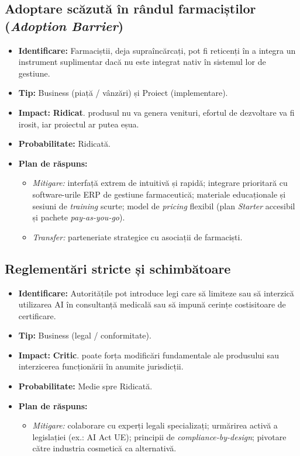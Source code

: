 \subsection{Adoptare scăzută în rândul farmaciștilor (\textit{Adoption Barrier})}
\begin{itemize}
    \item \textbf{Identificare:} Farmaciștii, deja supraîncărcați, pot fi reticenți în a integra un instrument suplimentar dacă nu este integrat nativ în sistemul lor de gestiune.
    \item \textbf{Tip:} Business (piață / vânzări) și Proiect (implementare).
    \item \textbf{Impact:} \textbf{Ridicat}. produsul nu va genera venituri, efortul de dezvoltare va fi irosit, iar proiectul ar putea eșua.
    \item \textbf{Probabilitate:} Ridicată.
    \item \textbf{Plan de răspuns:}
    \begin{itemize}
        \item \textit{Mitigare:} interfață extrem de intuitivă și rapidă; integrare prioritară cu software-urile ERP de gestiune farmaceutică; materiale educaționale și sesiuni de \textit{training} scurte; model de \textit{pricing} flexibil (plan \textit{Starter} accesibil și pachete \textit{pay-as-you-go}).
        \item \textit{Transfer:} parteneriate strategice cu asociații de farmaciști.
    \end{itemize}
\end{itemize}

\subsection{Reglementări stricte și schimbătoare}
\begin{itemize}
    \item \textbf{Identificare:} Autoritățile pot introduce legi care să limiteze sau să interzică utilizarea AI în consultanță medicală sau să impună cerințe costisitoare de certificare.
    \item \textbf{Tip:} Business (legal / conformitate).
    \item \textbf{Impact:} \textbf{Critic}. poate forța modificări fundamentale ale produsului sau interzicerea funcționării în anumite jurisdicții.
    \item \textbf{Probabilitate:} Medie spre Ridicată.
    \item \textbf{Plan de răspuns:}
    \begin{itemize}
        \item \textit{Mitigare:} colaborare cu experți legali specializați; urmărirea activă a legislației (ex.: AI Act UE); principii de \textit{compliance-by-design}; pivotare către industria cosmetică ca alternativă.
    \end{itemize}
\end{itemize}

